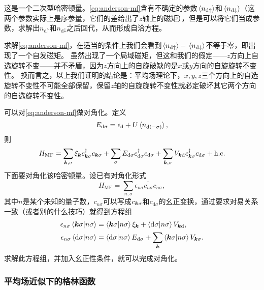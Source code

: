 这是一个二次型哈密顿量。\eqref{eq:anderson-mf}含有不确定的参数$\expval*{{n}_{\text{d} \uparrow}}$和$\expval*{{n}_{\text{d} \downarrow}}$（这两个参数实际上是序参量，它们的差给出了$z$轴上的磁矩），但是可以将它们当成参数，求解出${n}_{\text{d} \uparrow}$和${n}_{\text{d} \downarrow}$之后回代，从而形成自洽方程。

求解\eqref{eq:anderson-mf}，在适当的条件上我们会看到$\expval*{{n}_{\text{d} \uparrow}} - \expval*{{n}_{\text{d} \downarrow}}$不等于零，即出现了一个自发磁矩。
虽然出现了一个局域磁矩，但这和我们的假定——$z$方向上自选旋转不变——并不矛盾，因为$z$方向上的自旋破缺的是$x$或$y$方向的自旋旋转不变性。
换而言之，以上我们证明的结论是：平均场理论下，$x, y, z$三个方向上的自选旋转不变性不可能全部保留，保留$z$轴的自旋旋转不变性就必定破坏其它两个方向的自选旋转不变性。

可以对\eqref{eq:anderson-mf}做对角化。定义
\begin{equation}
    E_{\text{d} \sigma} = \epsilon_\text{d} + U \expval*{{n}_{\text{d} (-\sigma)}},
    \label{eq:energy-d-sigma}
\end{equation}
则
\begin{equation}
    {H}_\text{MF} = \sum_{\vb*{k}, \sigma} \xi_{\vb*{k}} {c}_{\vb*{k}\sigma}^\dagger {c}_{\vb*{k} \sigma} + \sum_\sigma E_{\text{d} \sigma} {c}_{\text{d}\sigma}^\dagger {c}_{\text{d} \sigma} + \sum_{\vb*{k}, \sigma} V_{\vb*{k} \text{d}} {c}_{\vb*{k} \sigma}^\dagger {c}_{\text{d} \sigma} + \text{h.c.}
\end{equation}
下面要对角化该哈密顿量。设已有对角化形式
\[
    {H}_\text{MF} = \sum_{n, \sigma} \epsilon_{n \sigma} {c}^\dagger_{n\sigma} {c}_{n\sigma},
\]
其中$n$是某个未知的量子数，${c}_{n \sigma}$可以写成${c}_{\vb*{k} \sigma}$和${c}_{\text{d} \sigma}$的幺正变换，通过要求对易关系一致（或者别的什么技巧）就得到方程组
\begin{equation}
    \begin{aligned}
        \epsilon_{n\sigma} \braket{\vb*{k}\sigma}{n \sigma} &= \braket{\vb*{k} \sigma}{n \sigma} \xi_{\vb*{k}} + \braket{\text{d} \sigma}{n \sigma} V_{\vb*{k} \text{d}}, \\
        \epsilon_{n \sigma} \braket{\text{d} \sigma}{n \sigma} &= \braket{\text{d} \sigma}{n \sigma} E_{\text{d} \sigma} + \sum_{\vb*{k}} \braket{\vb*{k} \sigma}{n \sigma} V_{\vb*{k} \sigma}.
    \end{aligned}
\end{equation}
求解此方程组，并加入幺正性条件，就可以完成对角化。

\subsubsection{平均场近似下的格林函数}

